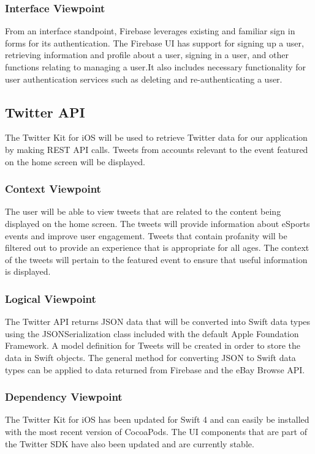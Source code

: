 \documentclass[onecolumn, draftclsnofoot,10pt, compsoc]{IEEEtran}
\begin{document}
\subsubsection{Interface Viewpoint}
From an interface standpoint, Firebase leverages existing and familiar sign in forms for its authentication. The Firebase UI has support for signing up a user, retrieving information and profile about a user, signing in a user, and other functions relating to managing a user.It also includes necessary functionality for user authentication services such as deleting and re-authenticating a user.


\subsection{Twitter API}
The Twitter Kit for iOS will be used to retrieve Twitter data for our application by making REST API calls\cite{twitter}. 
Tweets from accounts relevant to the event featured on the home screen will be displayed. 
\subsubsection{Context Viewpoint}
The user will be able to view tweets that are related to the content being displayed on the home screen. The tweets will provide information about eSports events and improve user engagement. Tweets that contain profanity will be filtered out to provide an experience that is appropriate for all ages. The context of the tweets will pertain to the featured event to ensure that useful information is displayed. 
\subsubsection{Logical Viewpoint}
The Twitter API returns JSON data that will be converted into Swift data types using the JSONSerialization class included with the default Apple Foundation Framework\cite{json}. 
A model definition for Tweets will be created in order to store the data in Swift objects. 
The general method for converting JSON to Swift data types can be applied to data returned from Firebase and the eBay Browse API.
\subsubsection{Dependency Viewpoint}
The Twitter Kit for iOS has been updated for Swift 4 and can easily be installed with the most recent version of CocoaPods. 
The UI components that are part of the Twitter SDK have also been updated and are currently stable. 
\end{document}

